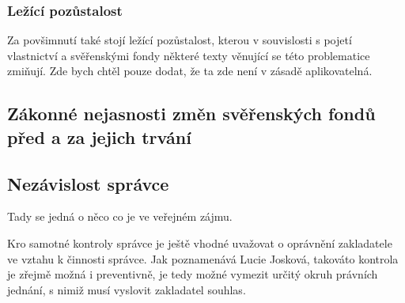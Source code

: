 \documentclass{article}
\begin{document}


\subsubsection{Ležící pozůstalost}

Za povšimnutí také stojí ležící pozůstalost, kterou v souvislosti s pojetí vlastnictví a svěřenskými fondy některé texty věnující se této problematice zmiňují. Zde bych chtěl pouze dodat, že ta zde není v zásadě aplikovatelná. 


\subsection{Zákonné nejasnosti změn svěřenských fondů před a za jejich trvání}


\subsection{Nezávislost správce}



Tady se jedná o něco co je ve veřejném zájmu.

Kro samotné kontroly správce je ještě vhodné uvažovat o oprávnění zakladatele ve vztahu k činnosti správce. Jak poznamenává Lucie Josková, takováto kontrola je zřejmě možná i preventivně, je tedy možné vymezit určitý okruh právních jednání, s nimiž musí vyslovit zakladatel souhlas. 
\end{document}
